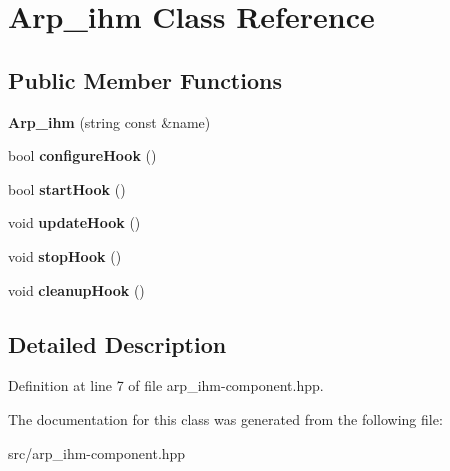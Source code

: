 \hypertarget{classArp__ihm}{
\section{Arp\_\-ihm Class Reference}
\label{classArp__ihm}
}
\subsection*{Public Member Functions}
\begin{DoxyCompactItemize}
\item 
\hypertarget{classArp__ihm_a9081e41ad4b31d46da710102f2c2c5cb}{
{\bfseries Arp\_\-ihm} (string const \&name)}
\label{classArp__ihm_a9081e41ad4b31d46da710102f2c2c5cb}

\item 
\hypertarget{classArp__ihm_a963a964614daf35e8bf2b9368dca4516}{
bool {\bfseries configureHook} ()}
\label{classArp__ihm_a963a964614daf35e8bf2b9368dca4516}

\item 
\hypertarget{classArp__ihm_a1606e2851c45629a07bda9c6a77ed1e4}{
bool {\bfseries startHook} ()}
\label{classArp__ihm_a1606e2851c45629a07bda9c6a77ed1e4}

\item 
\hypertarget{classArp__ihm_a848a76daa38983ad65a87095177b323d}{
void {\bfseries updateHook} ()}
\label{classArp__ihm_a848a76daa38983ad65a87095177b323d}

\item 
\hypertarget{classArp__ihm_a84cb11adaae315cf7128655bdaeeadf9}{
void {\bfseries stopHook} ()}
\label{classArp__ihm_a84cb11adaae315cf7128655bdaeeadf9}

\item 
\hypertarget{classArp__ihm_afec9b815d43039ac7c38d0babc8f19ed}{
void {\bfseries cleanupHook} ()}
\label{classArp__ihm_afec9b815d43039ac7c38d0babc8f19ed}

\end{DoxyCompactItemize}


\subsection{Detailed Description}


Definition at line 7 of file arp\_\-ihm-\/component.hpp.



The documentation for this class was generated from the following file:\begin{DoxyCompactItemize}
\item 
src/arp\_\-ihm-\/component.hpp\end{DoxyCompactItemize}
